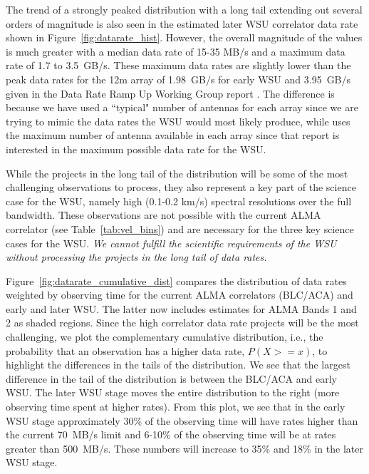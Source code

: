 \documentclass[preprint]{aastex631}
\begin{document}
The trend of a strongly peaked distribution with a long tail extending out several orders of magnitude is also seen in the estimated later WSU correlator data rate shown in Figure~\ref{fig:datarate_hist}. However, the overall magnitude of the values is much greater with a  median data rate of 15-35 MB/s  and a  maximum data rate of 1.7 to 3.5~GB/s. These maximum data rates are slightly lower than the peak data rates for the 12m array of 1.98~GB/s for early WSU and 3.95~GB/s  given in the Data Rate Ramp Up Working Group report \citet[][]{Carpenter2023DataRates}. The difference is because we have used a ``typical" number of antennas for each array since we are trying to mimic the data rates the WSU  would most likely produce, while \citet{Carpenter2023DataRates} uses the maximum number of antenna available in each array since that report is interested in the maximum possible data rate for the WSU.


While the projects in the long tail of the distribution will be some of the most challenging observations to process, they also represent a key part of the science case for the WSU, namely high (0.1-0.2 km/s) spectral resolutions over the full bandwidth. These observations are not possible with the current ALMA correlator (see Table~\ref{tab:vel_bins}) and are necessary for the three key science cases for the WSU. {\it We cannot fulfill the scientific requirements of the WSU without processing the projects in the long tail of data rates.}


Figure~\ref{fig:datarate_cumulative_dist} compares the distribution of data rates weighted by observing time for the current ALMA correlators (BLC/ACA) and early and later WSU. The latter now includes estimates for ALMA Bands 1 and 2 as shaded regions. Since the high correlator data rate projects will be the most challenging, we plot the complementary cumulative distribution, i.e., the probability that an observation has a higher data rate, $P(X>=x)$, to highlight the differences in the tails of the distribution. We see that the largest difference in the tail of the distribution is between the BLC/ACA and early WSU.  The later WSU stage moves the entire distribution to the right (more observing time spent at higher rates). From this plot, we see that in the early WSU stage approximately 30\% of the observing time  will have rates higher than the current 70~MB/s limit and 6-10\% of the observing time will be at rates greater than 500~MB/s. These numbers will increase to 35\% and 18\% in the later WSU stage.
\end{document}
